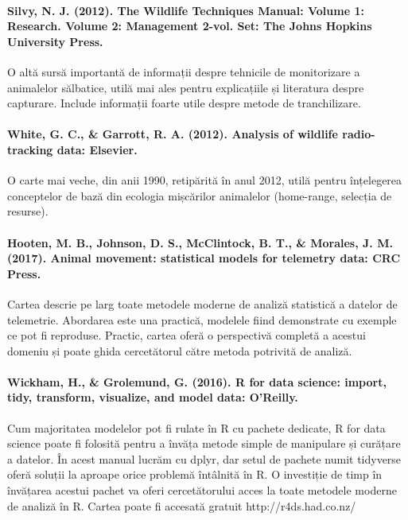 \documentclass[11pt,onehalfspacing]{elife}
\begin{document}
\paragraph{Silvy, N. J. (2012). The Wildlife Techniques Manual: Volume 1: Research. Volume 2: Management 2-vol. Set: The Johns Hopkins University Press.}

O altă sursă importantă de informații despre tehnicile de monitorizare a animalelor sălbatice, utilă mai ales pentru explicațiile și literatura despre capturare. Include informații foarte utile despre metode de tranchilizare.

\paragraph{White, G. C., \& Garrott, R. A. (2012). Analysis of wildlife radio-tracking data: Elsevier.}

O carte mai veche, din anii 1990,  retipărită în anul 2012, utilă pentru înțelegerea conceptelor de bază din ecologia mișcărilor animalelor (home-range, selecția de resurse).

\paragraph{Hooten, M. B., Johnson, D. S., McClintock, B. T., \& Morales, J. M. (2017). Animal movement: statistical models for telemetry data: CRC Press.}

Cartea descrie pe larg toate metodele moderne de analiză statistică a datelor de telemetrie. Abordarea este una practică, modelele fiind demonstrate cu exemple ce pot fi reproduse. Practic, cartea oferă o perspectivă completă a acestui domeniu și poate ghida cercetătorul către metoda potrivită de analiză.

\paragraph{Wickham, H., \& Grolemund, G. (2016). R for data science: import, tidy, transform, visualize, and model data: O'Reilly.}

Cum majoritatea modelelor pot fi rulate în R cu pachete dedicate, R for data science poate fi folosită pentru a învăța metode simple de manipulare și curățare a datelor. În acest manual lucrăm cu dplyr, dar setul de pachete numit tidyverse oferă soluții la aproape orice problemă întâlnită în R. O investiție de timp în învățarea acestui pachet va oferi cercetătorului acces la toate metodele moderne de analiză în R. Cartea poate fi accesată gratuit http://r4ds.had.co.nz/
\end{document}
